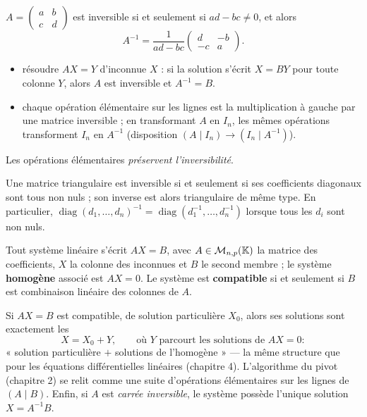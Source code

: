 \begin{exemple}
$A=\begin{pmatrix}a&b\\c&d\end{pmatrix}$ est inversible si et seulement si
$ad-bc\neq0$, et alors
\[
  A^{-1}=\frac{1}{ad-bc}\begin{pmatrix}d&-b\\-c&a\end{pmatrix}.
\]
\end{exemple}

\begin{savoirfaire}
\begin{itemize}[label={\color{otGreenDark}\textbullet},leftmargin=1.4em,itemsep=0.6mm,topsep=0.5mm]
  \item {} résoudre $AX=Y$ d'inconnue $X$ : si la
    solution s'écrit $X=BY$ pour toute colonne $Y$, alors $A$ est
    inversible et $A^{-1}=B$.
  \item {} chaque opération
    élémentaire sur les lignes est la multiplication à gauche par une
    matrice inversible ; en transformant $A$ en $I_n$, les mêmes
    opérations transforment $I_n$ en $A^{-1}$ (disposition
    $(A\mid I_n)\to(I_n\mid A^{-1})$).
\end{itemize}
Les opérations élémentaires \emph{préservent l'inversibilité}.
\end{savoirfaire}

\begin{theoreme}
Une matrice triangulaire est inversible si et seulement si ses coefficients
diagonaux sont tous non nuls ; son inverse est alors triangulaire de même
type. En particulier,
$\operatorname{diag}(d_1,\dots,d_n)^{-1}
=\operatorname{diag}(d_1^{-1},\dots,d_n^{-1})$ lorsque tous les $d_i$ sont
non nuls.
\end{theoreme}


\begin{definition}
Tout système linéaire s'écrit $AX=B$, avec $A\in\mathcal{M}_{n,p}(\mathbb{K})$ la
matrice des coefficients, $X$ la colonne des inconnues et $B$ le second
membre ; le système \textbf{homogène} associé est $AX=0$. Le système est
\textbf{compatible} si et seulement si $B$ est combinaison linéaire des
colonnes de $A$.
\end{definition}

\begin{theoreme}
Si $AX=B$ est compatible, de solution particulière $X_0$, alors ses
solutions sont exactement les
\[
  X=X_0+Y,\qquad\text{où $Y$ parcourt les solutions de }AX=0 :
\]
« solution particulière $+$ solutions de l'homogène » — la même structure
que pour les équations différentielles linéaires (chapitre 4). L'algorithme
du pivot (chapitre 2) se relit comme une suite d'opérations élémentaires
sur les lignes de $(A\mid B)$. Enfin, si $A$ est \emph{carrée inversible},
le système possède l'unique solution $X=A^{-1}B$.
\end{theoreme}

